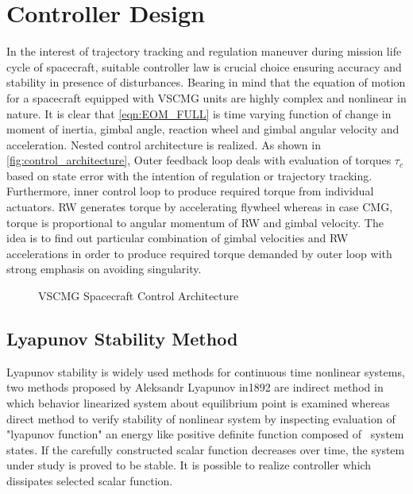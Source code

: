 \chapter{Controller Design}
\label{chap:4}
In the interest of trajectory tracking and regulation maneuver during mission life cycle of spacecraft, suitable controller law is crucial choice ensuring accuracy and stability in presence of disturbances. Bearing in mind that the equation of motion for a spacecraft equipped with VSCMG units are highly complex and nonlinear in nature. It is clear that \autoref{eqn:EOM_FULL} is time varying function of change in moment of inertia, gimbal angle, reaction wheel and gimbal angular velocity and acceleration. Nested control architecture is realized. As shown in \autoref{fig:control_architecture}, Outer feedback loop deals with evaluation of torques $\tau_{c}$ based on state error with the intention of regulation or trajectory tracking. Furthermore, inner control loop to produce required torque from individual actuators. RW generates torque by accelerating flywheel whereas in case CMG, torque is proportional to angular momentum of RW and gimbal velocity. The idea is to find out particular combination of gimbal velocities and RW accelerations in order to produce required torque demanded by outer loop with strong emphasis on avoiding singularity.
\begin{figure}[!h]
    \centering
    
    \caption{VSCMG Spacecraft Control Architecture}
    \label{fig:control_architecture}
\end{figure}

\section{Lyapunov Stability Method}
Lyapunov stability is widely used methods for continuous time nonlinear systems, two methods proposed by Aleksandr Lyapunov in1892 are indirect method in which behavior linearized system about equilibrium point is examined whereas direct method to verify stability of nonlinear system by inspecting evaluation of "lyapunov function" an energy like positive definite function composed of \ system states. If the carefully constructed scalar function decreases over time, the system under study is proved to be stable. It is possible to realize controller which dissipates selected scalar function.

